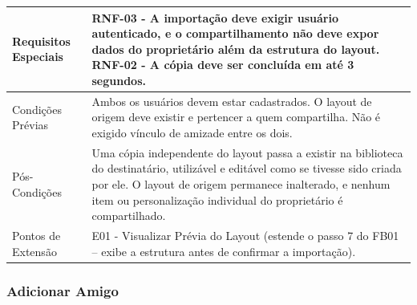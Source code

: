 \begin{longtable}{ >{\raggedright}p{2.8cm} | >{\raggedright\arraybackslash}p{10.7cm} }
Requisitos Especiais & RNF-03 - A importação deve exigir usuário autenticado, e o compartilhamento não deve expor dados do proprietário além da estrutura do layout. RNF-02 - A cópia deve ser concluída em até 3 segundos. \\ \hline

Condições Prévias & Ambos os usuários devem estar cadastrados. O layout de origem deve existir e pertencer a quem compartilha. Não é exigido vínculo de amizade entre os dois. \\ \hline

Pós-Condições & Uma cópia independente do layout passa a existir na biblioteca do destinatário, utilizável e editável como se tivesse sido criada por ele. O layout de origem permanece inalterado, e nenhum item ou personalização individual do proprietário é compartilhado. \\ \hline

Pontos de Extensão & E01 - Visualizar Prévia do Layout (estende o passo 7 do FB01 -- exibe a estrutura antes de confirmar a importação). \\
\end{longtable}
\renewcommand{\arraystretch}{1}
\FloatBarrier


\subsubsection{Adicionar Amigo}

